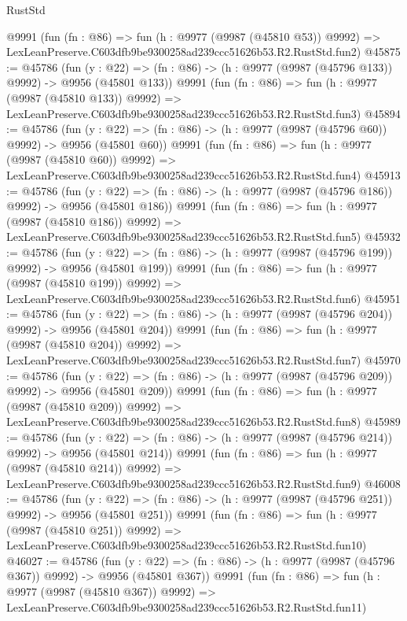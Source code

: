 \begin{lexlean}{RustStd}
\begin{coremodule}
    @9991
    (fun (fn : @86) =>
    fun (h : @9977 (@9987 (@45810 @53)) @9992) =>
    LexLeanPreserve.C603dfb9be9300258ad239ccc51626b53.R2.RustStd.fun2)
@45875 := @45786
    (fun (y : @22) => (fn : @86) -> (h : @9977 (@9987 (@45796 @133)) @9992) -> @9956 (@45801 @133))
    @9991
    (fun (fn : @86) =>
    fun (h : @9977 (@9987 (@45810 @133)) @9992) =>
    LexLeanPreserve.C603dfb9be9300258ad239ccc51626b53.R2.RustStd.fun3)
@45894 := @45786
    (fun (y : @22) => (fn : @86) -> (h : @9977 (@9987 (@45796 @60)) @9992) -> @9956 (@45801 @60))
    @9991
    (fun (fn : @86) =>
    fun (h : @9977 (@9987 (@45810 @60)) @9992) =>
    LexLeanPreserve.C603dfb9be9300258ad239ccc51626b53.R2.RustStd.fun4)
@45913 := @45786
    (fun (y : @22) => (fn : @86) -> (h : @9977 (@9987 (@45796 @186)) @9992) -> @9956 (@45801 @186))
    @9991
    (fun (fn : @86) =>
    fun (h : @9977 (@9987 (@45810 @186)) @9992) =>
    LexLeanPreserve.C603dfb9be9300258ad239ccc51626b53.R2.RustStd.fun5)
@45932 := @45786
    (fun (y : @22) => (fn : @86) -> (h : @9977 (@9987 (@45796 @199)) @9992) -> @9956 (@45801 @199))
    @9991
    (fun (fn : @86) =>
    fun (h : @9977 (@9987 (@45810 @199)) @9992) =>
    LexLeanPreserve.C603dfb9be9300258ad239ccc51626b53.R2.RustStd.fun6)
@45951 := @45786
    (fun (y : @22) => (fn : @86) -> (h : @9977 (@9987 (@45796 @204)) @9992) -> @9956 (@45801 @204))
    @9991
    (fun (fn : @86) =>
    fun (h : @9977 (@9987 (@45810 @204)) @9992) =>
    LexLeanPreserve.C603dfb9be9300258ad239ccc51626b53.R2.RustStd.fun7)
@45970 := @45786
    (fun (y : @22) => (fn : @86) -> (h : @9977 (@9987 (@45796 @209)) @9992) -> @9956 (@45801 @209))
    @9991
    (fun (fn : @86) =>
    fun (h : @9977 (@9987 (@45810 @209)) @9992) =>
    LexLeanPreserve.C603dfb9be9300258ad239ccc51626b53.R2.RustStd.fun8)
@45989 := @45786
    (fun (y : @22) => (fn : @86) -> (h : @9977 (@9987 (@45796 @214)) @9992) -> @9956 (@45801 @214))
    @9991
    (fun (fn : @86) =>
    fun (h : @9977 (@9987 (@45810 @214)) @9992) =>
    LexLeanPreserve.C603dfb9be9300258ad239ccc51626b53.R2.RustStd.fun9)
@46008 := @45786
    (fun (y : @22) => (fn : @86) -> (h : @9977 (@9987 (@45796 @251)) @9992) -> @9956 (@45801 @251))
    @9991
    (fun (fn : @86) =>
    fun (h : @9977 (@9987 (@45810 @251)) @9992) =>
    LexLeanPreserve.C603dfb9be9300258ad239ccc51626b53.R2.RustStd.fun10)
@46027 := @45786
    (fun (y : @22) => (fn : @86) -> (h : @9977 (@9987 (@45796 @367)) @9992) -> @9956 (@45801 @367))
    @9991
    (fun (fn : @86) =>
    fun (h : @9977 (@9987 (@45810 @367)) @9992) =>
    LexLeanPreserve.C603dfb9be9300258ad239ccc51626b53.R2.RustStd.fun11)

\end{coremodule}
\end{lexlean}
